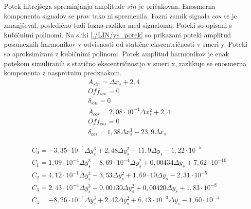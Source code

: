 Potek hitrejšega spreminjanja amplitude $sin$ je pričakovan. Enosmerna komponenta signalov se prav tako ni spremenila. Fazni zamik signala $cos$ se je zmanjševal, posledično tudi fazna razlika med signaloma. Poteki so opisani s kubičnimi polinomi. Na sliki \ref{./LIN/ys_potek} so prikazani poteki amplitud posameznih harmonikov v odvisnosti od statične ekscentričnosti v smeri y. Poteki so aproksimirani z kubičnimi polinomi. Potek amplitud harmonikov je enak potekom simuliranih s statično ekscentričnostjo v smeri x, razlikuje se enosmerna komponenta z nasprotnim predznakom.
\begin{eqnarray}
\label{analog_lin_ys}
 &A_{sin} = \Delta x_s+2,4\\
 &Off_{sin} = 0 \\
 &\delta_{sin} =0 \\
 &A_{cos} = 2,08 \cdot 10^{-1} \Delta x_s^2+2,4\\
 &Off_{cos} = 0 \\
 &\delta_{cos} = 1,38 \Delta x_s^3- 23,9 \Delta x_s
\end{eqnarray}



\begin{eqnarray}
\label{nap_lin_ys}
&C_0 =-3,35\cdot 10^{-1}\Delta y_s^{3}+2,48\Delta y_s^{2}-11,9\Delta y_s-1,22\cdot 10^{-5}\\                  
&C_1 =1,09\cdot 10^{-4}\Delta y_s^{3}-8,69\cdot 10^{-4}\Delta y_s^{2}+0,00434\Delta y_s+7,62\cdot 10^{-10} \\
&C_2 =4,12\cdot 10^{-1}\Delta y_s^{3}-3,53\Delta y_s^{2}+1,69\cdot 10\Delta y_s-2,31\cdot 10^{-5} \\                   
&C_3 =2,43\cdot 10^{-4}\Delta y_s^{3}-0,00130\Delta y_s^{2}+0,00420\Delta y_s+1,83\cdot 10^{-8} \\ 
&C_4 =-8,26\cdot 10^{-1}\Delta y_s^{3}+2,42\Delta y_s^{2}+6,13\cdot 10^{-3}\Delta y_s-1,60\cdot 10^{-4}            
\end{eqnarray}

